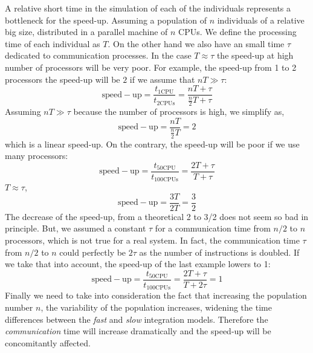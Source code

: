 \documentclass[a4paper, 11pt]{article}
\begin{document}
A relative short time in the simulation of each of the individuals represents a bottleneck for the speed-up.
Assuming a population of $n$ individuals of a relative big size, distributed in a parallel machine of $n$ CPUs.
We define the processing time of each individual as $T$. 
On the other hand we also have an small time $\tau$ dedicated to communication processes.
In the case $T \approx \tau$ the speed-up at high number of processors will be very poor.
For example, the speed-up from 1 to 2 processors the speed-up will be $2$ if we assume that $nT \gg \tau$:
\begin{equation}
  \mathrm{speed-up} = \frac{t_{\mathrm{1 CPU}}}{t_{\mathrm{2 CPUs}}} = \frac{nT+\tau}{\frac{n}{2}T+\tau} 
\end{equation}
Assuming $nT\gg\tau$ because the number of processors is high, we simplify as, 
\begin{equation}
  \mathrm{speed-up} = \frac{nT}{\frac{n}{2}T} =  2
\end{equation}
which is a linear speed-up. 
On the contrary, the speed-up will be poor if we use many processors:
\begin{equation}
  \mathrm{speed-up} = \frac{t_{\mathrm{50 CPU}}}{t_{\mathrm{100 CPUs}}} = \frac{2T+\tau}{T+\tau}
\end{equation}
$T\approx\tau$,
\begin{equation}
  \mathrm{speed-up} = \frac{3T}{2T} = \frac{3}{2}
\end{equation}
The decrease of the speed-up, from a theoretical 2 to 3/2 does not seem so bad in principle.
But, we assumed a constant $\tau$ for a communication time from $n/2$ to $n$ processors, which is not true for a real system. 
In fact, the communication time $\tau$ from $n/2$ to $n$ could perfectly be $2\tau$ as the number of instructions is doubled. 
If we take that into account, the speed-up of the last example lowers to 1:
\begin{equation}
  \mathrm{speed-up} = \frac{t_{\mathrm{50 CPU}}}{t_{\mathrm{100 CPUs}}} = \frac{2T+\tau}{T+2\tau} = 1
\end{equation}
Finally we need to take into consideration the fact that increasing the population number $n$, the variability of the population increases, widening the time differences between the \emph{fast} and \emph{slow} integration models. 
Therefore the \emph{communication} time will increase dramatically and the speed-up will be concomitantly affected.    
\end{document}
